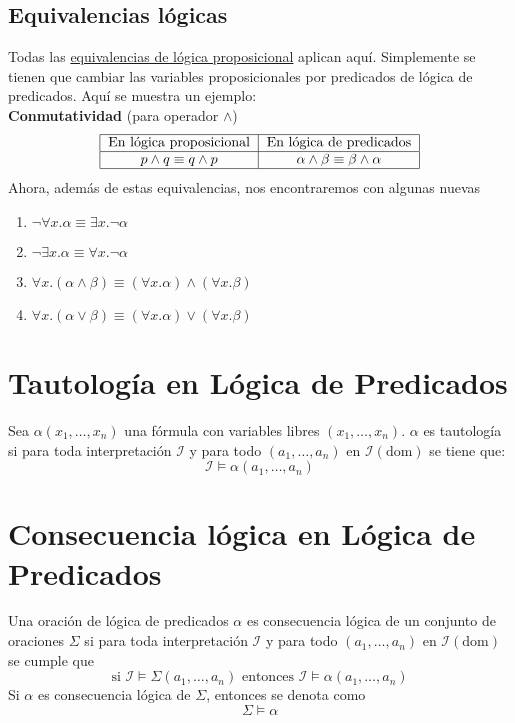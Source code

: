 \documentclass{article}
\begin{document}
\subsection{Equivalencias lógicas}
Todas las \hyperref[sec:equiv_logica_util]{equivalencias de lógica proposicional} aplican aquí. Simplemente se tienen que cambiar las variables proposicionales por predicados de lógica de predicados. Aquí se muestra un ejemplo:\\
\textbf{Conmutatividad} (para operador $\wedge$)
\[    
    \begin{tabular}{|c|c|}
        \hline
        En lógica proposicional & En lógica de predicados\\ \hline
        $p \wedge{} q \equiv{} q \wedge{} p$ & $\alpha{} \wedge{} \beta{} \equiv{} \beta{} \wedge{} \alpha{}$ \\ \hline
    \end{tabular}
\]
Ahora, además de estas equivalencias, nos encontraremos con algunas nuevas
\begin{enumerate}
    \item $\neg \forall x . \alpha \equiv \exists x . \neg \alpha$
    \item $\neg \exists x . \alpha \equiv \forall x . \neg \alpha$
    \item $\forall x . (\alpha \wedge \beta) \equiv (\forall x . \alpha) \wedge (\forall x . \beta)$
    \item $\forall x . (\alpha \vee \beta) \equiv (\forall x . \alpha) \vee (\forall x . \beta)$
\end{enumerate}

\section{Tautología en Lógica de Predicados}
Sea $\alpha{}(x_{1}, \ldots, x_{n})$ una fórmula con variables libres $(x_{1}, \ldots, x_{n})$. $\alpha$ es tautología si para toda interpretación $\mathcal{I}$ y para todo $(a_{1}, \ldots, a_{n})$ en $\mathcal{I}(\text{dom})$ se tiene que:
$$\mathcal{I} \models \alpha{}(a_{1}, \ldots, a_{n})$$

\section{Consecuencia lógica en Lógica de Predicados}
Una oración de lógica de predicados $\alpha$ es consecuencia lógica de un conjunto de oraciones $\Sigma$ si para toda interpretación $\mathcal{I}$ y para todo $(a_{1}, \ldots, a_{n})$ en $\mathcal{I}(\text{dom})$ se cumple que
$$\text{si } \mathcal{I} \models \Sigma{}(a_{1}, \ldots, a_{n}) \text{ entonces } \mathcal{I} \models \alpha{}(a_{1}, \ldots, a_{n})$$
Si $\alpha$ es consecuencia lógica de $\Sigma$, entonces se denota como
$$\Sigma \models \alpha$$
\end{document}
